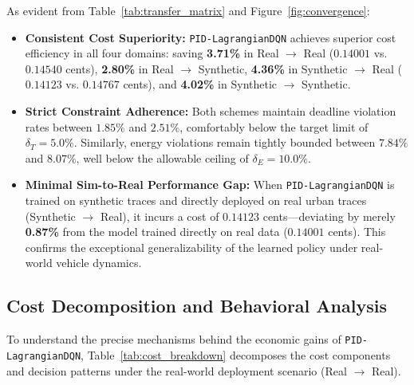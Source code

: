 \documentclass[12pt,a4paper]{article}
\begin{document}
As evident from Table~\ref{tab:transfer_matrix} and Figure~\ref{fig:convergence}:
\begin{itemize}
    \item \textbf{Consistent Cost Superiority:} \texttt{PID-LagrangianDQN} achieves superior cost efficiency in all four domains: saving \textbf{3.71\%} in Real $\to$ Real ($0.14001$ vs. $0.14540$ cents), \textbf{2.80\%} in Real $\to$ Synthetic, \textbf{4.36\%} in Synthetic $\to$ Real ($0.14123$ vs. $0.14767$ cents), and \textbf{4.02\%} in Synthetic $\to$ Synthetic.
    \item \textbf{Strict Constraint Adherence:} Both schemes maintain deadline violation rates between $1.85\%$ and $2.51\%$, comfortably below the target limit of $\delta_T = 5.0\%$. Similarly, energy violations remain tightly bounded between $7.84\%$ and $8.07\%$, well below the allowable ceiling of $\delta_E = 10.0\%$.
    \item \textbf{Minimal Sim-to-Real Performance Gap:} When \texttt{PID-LagrangianDQN} is trained on synthetic traces and directly deployed on real urban traces (Synthetic $\to$ Real), it incurs a cost of $0.14123$ cents—deviating by merely \textbf{0.87\%} from the model trained directly on real data ($0.14001$ cents). This confirms the exceptional generalizability of the learned policy under real-world vehicle dynamics.
\end{itemize}

\subsection{Cost Decomposition and Behavioral Analysis}
To understand the precise mechanisms behind the economic gains of \texttt{PID-LagrangianDQN}, Table~\ref{tab:cost_breakdown} decomposes the cost components and decision patterns under the real-world deployment scenario (Real $\to$ Real).
\end{document}
